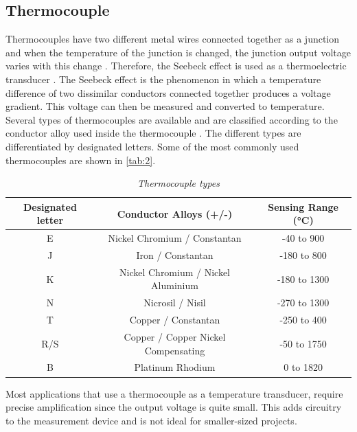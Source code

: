 \subsection{Thermocouple}
Thermocouples have two different metal wires connected together as a junction and when the temperature of the junction is changed, the junction output voltage varies with this change \cite{Nookhao2020}. Therefore, the Seebeck effect is used as a thermoelectric transducer \cite{Chen2019}. The Seebeck effect is the phenomenon in which a temperature difference of two dissimilar conductors connected together produces a voltage gradient. This voltage can then be measured and converted to temperature. Several types of thermocouples are available and are classified according to the conductor alloy used inside the thermocouple \cite{Gums2018}. The different types are differentiated by designated letters. Some of the most commonly used thermocouples are shown in \autoref{tab:2}.
\begin{table}[H]
	\centering
	\caption{\textit{Thermocouple types \cite{Maxim2017}}}
	\label{tab:2}
	\begin{tabular}{|c|c|c|}
		\hline
		\textbf{Designated letter} & \textbf{Conductor Alloys (+/-)} & \textbf{Sensing Range (°C)}\\
		\hline
		E & Nickel Chromium / Constantan & -40 to 900\\
		\hline
		J & Iron / Constantan & -180 to 800\\
		\hline
		K & Nickel Chromium / Nickel Aluminium & -180 to 1300\\
		\hline
		N & Nicrosil / Nisil & -270 to 1300\\
		\hline
		T & Copper / Constantan & -250 to 400\\
		\hline
		R/S & Copper / Copper Nickel Compensating & -50 to 1750\\
		\hline
		B & Platinum Rhodium & 0 to 1820\\
		\hline
	\end{tabular}
\end{table}
\noindent
Most applications that use a thermocouple as a temperature transducer, require precise amplification since the output voltage is quite small. This adds circuitry to the measurement device and is not ideal for smaller-sized projects.

